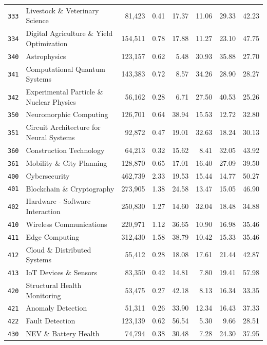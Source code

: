 \begin{longtable}{@{}l l r r r r r r@{}}
\texttt{333} & Livestock \& Veterinary Science & 81,423 & 0.41 & 17.37 & 11.06 & 29.33 & 42.23 \\
\texttt{334} & Digital Agriculture \& Yield Optimization & 154,511 & 0.78 & 17.88 & 11.27 & 23.10 & 47.75 \\
\texttt{340} & Astrophysics & 123,157 & 0.62 & 5.48 & 30.93 & 35.88 & 27.70 \\
\texttt{341} & Computational Quantum Systems & 143,383 & 0.72 & 8.57 & 34.26 & 28.90 & 28.27 \\
\texttt{342} & Experimental Particle \& Nuclear Physics & 56,162 & 0.28 & 6.71 & 27.50 & 40.53 & 25.26 \\
\texttt{350} & Neuromorphic Computing & 126,701 & 0.64 & 38.94 & 15.53 & 12.72 & 32.80 \\
\texttt{351} & Circuit Architecture for Neural Systems & 92,872 & 0.47 & 19.01 & 32.63 & 18.24 & 30.13 \\
\texttt{360} & Construction Technology & 64,213 & 0.32 & 15.62 & 8.41 & 32.05 & 43.92 \\
\texttt{361} & Mobility \& City Planning & 128,870 & 0.65 & 17.01 & 16.40 & 27.09 & 39.50 \\
\texttt{400} & Cybersecurity & 462,739 & 2.33 & 19.53 & 15.44 & 14.77 & 50.27 \\
\texttt{401} & Blockchain \& Cryptography & 273,905 & 1.38 & 24.58 & 13.47 & 15.05 & 46.90 \\
\texttt{402} & Hardware - Software Interaction & 250,830 & 1.27 & 14.60 & 32.04 & 18.48 & 34.88 \\
\texttt{410} & Wireless Communications & 220,971 & 1.12 & 36.65 & 10.90 & 16.98 & 35.46 \\
\texttt{411} & Edge Computing & 312,430 & 1.58 & 38.79 & 10.42 & 15.33 & 35.46 \\
\texttt{412} & Cloud \& Distributed Systems & 55,412 & 0.28 & 18.08 & 17.61 & 21.44 & 42.87 \\
\texttt{413} & IoT Devices \& Sensors & 83,350 & 0.42 & 14.81 & 7.80 & 19.41 & 57.98 \\
\texttt{420} & Structural Health Monitoring & 53,475 & 0.27 & 42.18 & 8.13 & 16.34 & 33.35 \\
\texttt{421} & Anomaly Detection & 51,311 & 0.26 & 33.90 & 12.34 & 16.43 & 37.33 \\
\texttt{422} & Fault Detection & 123,139 & 0.62 & 56.54 & 5.30 & 9.66 & 28.51 \\
\texttt{430} & NEV \& Battery Health & 74,794 & 0.38 & 30.48 & 7.28 & 24.30 & 37.95 \\

\end{longtable}
